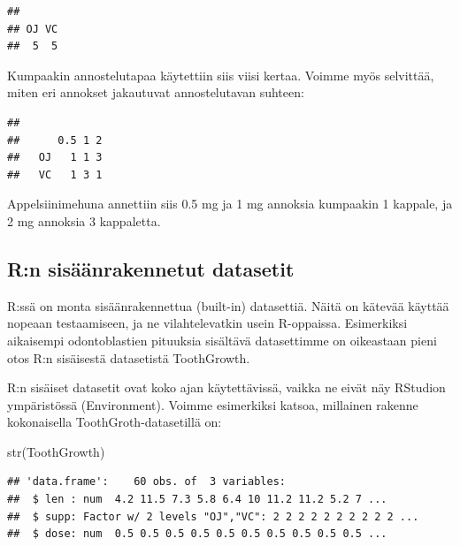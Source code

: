 \documentclass[
]{book}
\newenvironment{Shaded}{\begin{snugshade}}{\end{snugshade}}
\newcommand{\FunctionTok}[1]{\textcolor[rgb]{0.00,0.00,0.00}{#1}}
\newcommand{\NormalTok}[1]{#1}
\newcommand{\SpecialCharTok}[1]{\textcolor[rgb]{0.00,0.00,0.00}{#1}}
\begin{document}
\begin{verbatim}
## 
## OJ VC 
##  5  5
\end{verbatim}

Kumpaakin annostelutapaa käytettiin siis viisi kertaa. Voimme myös selvittää, miten eri annokset jakautuvat annostelutavan suhteen:

\begin{Shaded}
\end{Shaded}

\begin{verbatim}
##     
##      0.5 1 2
##   OJ   1 1 3
##   VC   1 3 1
\end{verbatim}

Appelsiinimehuna annettiin siis 0.5 mg ja 1 mg annoksia kumpaakin 1 kappale, ja 2 mg annoksia 3 kappaletta.

\hypertarget{rn-sisuxe4uxe4nrakennetut-datasetit}{%
\subsection{R:n sisäänrakennetut datasetit}\label{rn-sisuxe4uxe4nrakennetut-datasetit}}

R:ssä on monta sisäänrakennettua (built-in) datasettiä. Näitä on kätevää käyttää nopeaan testaamiseen, ja ne vilahtelevatkin usein R-oppaissa. Esimerkiksi aikaisempi odontoblastien pituuksia sisältävä datasettimme on oikeastaan pieni otos R:n sisäisestä datasetistä ToothGrowth.

R:n sisäiset datasetit ovat koko ajan käytettävissä, vaikka ne eivät näy RStudion ympäristössä (Environment). Voimme esimerkiksi katsoa, millainen rakenne kokonaisella ToothGroth-datasetillä on:

\begin{Shaded}
\begin{Highlighting}[]
\FunctionTok{str}\NormalTok{(ToothGrowth)}
\end{Highlighting}
\end{Shaded}

\begin{verbatim}
## 'data.frame':    60 obs. of  3 variables:
##  $ len : num  4.2 11.5 7.3 5.8 6.4 10 11.2 11.2 5.2 7 ...
##  $ supp: Factor w/ 2 levels "OJ","VC": 2 2 2 2 2 2 2 2 2 2 ...
##  $ dose: num  0.5 0.5 0.5 0.5 0.5 0.5 0.5 0.5 0.5 0.5 ...
\end{verbatim}
\end{document}
